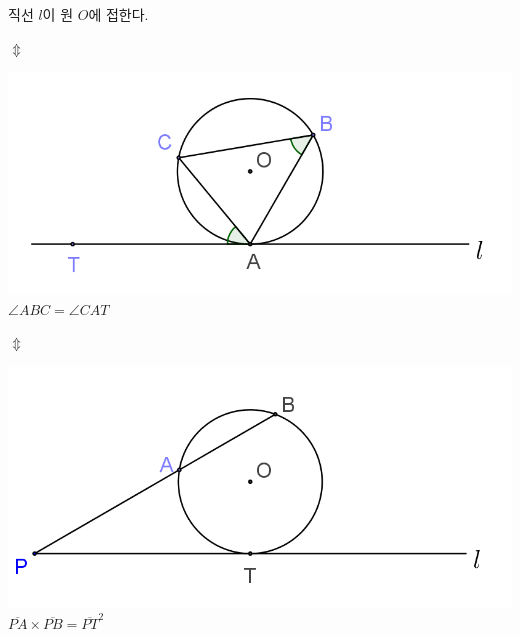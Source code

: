 \documentclass[twocolumn]{article}
\newcommand\ov[2]{\ensuremath{\overline{#1#2}}}
\begin{document}
\vspace{0.13\textheight}

\begin{mdframed}
직선 \(l\)이 원 \(O\)에 접한다.
\end{mdframed}

%

\(\Updownarrow\)

\begin{mdframed}
\includegraphics{6}\\
\(\angle ABC=\angle CAT\)
\end{mdframed}

\(\Updownarrow\)

\begin{mdframed}
\includegraphics{7}\\
\(\ov PA\times\ov PB=\ov PT^2\)
\end{mdframed}
\end{document}
